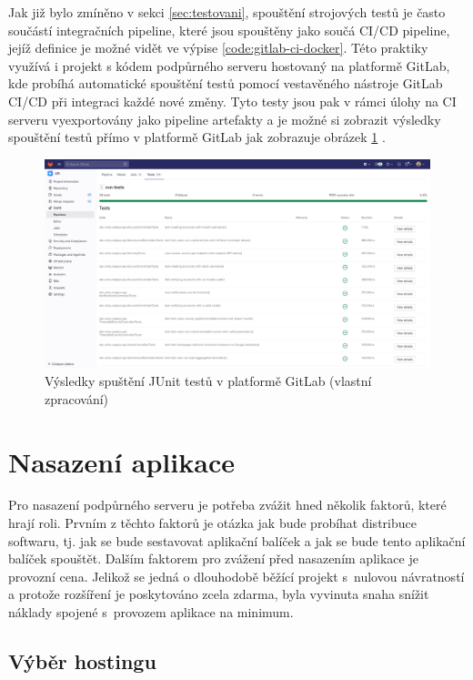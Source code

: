 Jak již bylo zmíněno v sekci \ref{sec:testovani}, spouštění strojových testů je často součástí integračních pipeline, které jsou spouštěny jako součá CI/CD pipeline, jejíž definice je možné vidět ve výpise \ref{code:gitlab-ci-docker}. Této praktiky využívá i projekt s kódem podpůrného serveru hostovaný na platformě GitLab, kde probíhá automatické spouštění testů pomocí vestavěného nástroje GitLab CI/CD při integraci každé nové změny. Tyto testy jsou pak v rámci úlohy na CI serveru vyexportovány jako pipeline artefakty a je možné si zobrazit výsledky spouštění testů přímo v platformě GitLab jak zobrazuje obrázek \ref{fig:gitlab-ci-junit} \cite{gitlab_unit_test_reports}. 

\begin{figure}[htbp!]\centering
    \includegraphics[width=\textwidth]{img/gitlab-ci-junit.png}
    \caption{Výsledky spuštění JUnit testů v platformě GitLab (vlastní zpracování)}
    \label{fig:gitlab-ci-junit}
\end{figure}
 
\section{Nasazení aplikace}

Pro nasazení podpůrného serveru je potřeba zvážit hned několik faktorů, které hrají roli. 
Prvním z těchto faktorů je otázka jak bude probíhat distribuce softwaru, tj. jak se bude sestavovat aplikační balíček a jak se bude tento aplikační balíček spouštět. 
Dalším faktorem pro zvážení před nasazením aplikace je provozní cena. Jelikož se jedná o dlouhodobě běžící projekt s~nulovou návratností a protože rozšíření je poskytováno zcela zdarma, byla vyvinuta snaha snížit náklady spojené s~provozem aplikace na minimum.

\subsection{Výběr hostingu}

